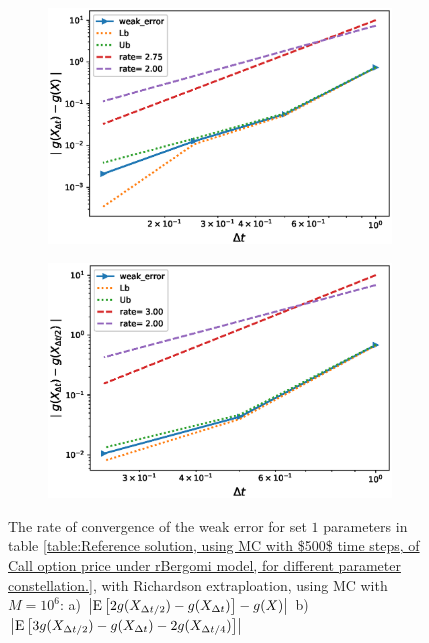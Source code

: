 \documentclass[11pt]{article}
\newcommand{\expt}[1]{\mathrm{E}\left[#1\right]}
\begin{document}
\begin{figure}[h!]
	\centering
	\begin{subfigure}{.4\textwidth}
		\centering
		\includegraphics[width=1\linewidth]{./figures/rBergomi_weak_error_rates/with_richardson/H_043/weak_convergence_order_Bergomi_H_043_K_1_M_10_6_richardson_relative}
		\caption{}
		\label{fig:sub3}
	\end{subfigure}%
	\begin{subfigure}{.4\textwidth}
		\centering
		\includegraphics[width=1\linewidth]{./figures/rBergomi_weak_error_rates/with_richardson/H_043/weak_convergence_order_differences_Bergomi_H_043_K_1_M_10_6_richardson_relative}
		\caption{}
		\label{fig:sub4}
	\end{subfigure}
	
	\caption{The rate of convergence of the weak error for set $1$ parameters in table \ref{table:Reference solution, using MC with $500$ time steps, of Call option price under rBergomi model, for different parameter constellation.}, with Richardson extraploation, using MC with $M=10^6$: a) $\abs{\expt{2 g(X_{\Delta t/2}) -g(X_{\Delta t})}-g(X)}$  b) $\abs{\expt{3 g(X_{\Delta t/2})-g(X_{\Delta t})-2 g(X_{\Delta t/4})}}$ }
	\label{fig:Weak_rate_H_043_with_rich}
\end{figure}
\end{document}
